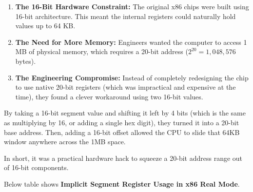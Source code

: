 \begin{enumerate}
\def\labelenumi{\arabic{enumi}.}
\tightlist
\item
  \textbf{The 16-Bit Hardware Constraint:} The original x86 chips were built using 16-bit architecture. This meant the internal registers could naturally hold values up to 64 KB.
\item
  \textbf{The Need for More Memory:} Engineers wanted the computer to access 1 MB of physical memory, which requires a 20-bit address (\(2^{20} = 1,048,576\) bytes).
\item
  \textbf{The Engineering Compromise:} Instead of completely redesigning the chip to use native 20-bit registers (which was impractical and expensive at the time), they found a clever workaround using two 16-bit values.
\end{enumerate}

By taking a 16-bit segment value and shifting it left by 4 bits (which is the same as multiplying by 16, or adding a single hex digit), they turned it into a 20-bit base address. Then, adding a 16-bit offset allowed the CPU to slide that 64KB window anywhere across the 1MB space.

In short, it was a practical hardware hack to squeeze a 20-bit address range out of 16-bit components.

Below table shows \textbf{Implicit Segment Register Usage in x86 Real Mode}.

